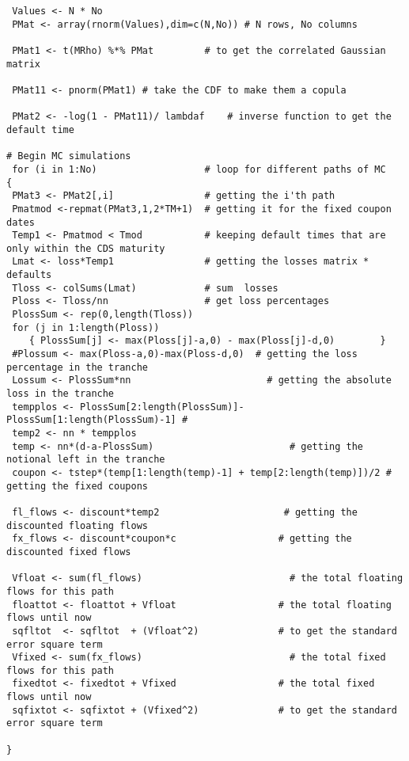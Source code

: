 \begin{singlespace}
\begin{lstlisting}
 Values <- N * No
 PMat <- array(rnorm(Values),dim=c(N,No)) # N rows, No columns
  
 PMat1 <- t(MRho) %*% PMat         # to get the correlated Gaussian matrix  
   
 PMat11 <- pnorm(PMat1) # take the CDF to make them a copula     

 PMat2 <- -log(1 - PMat11)/ lambdaf    # inverse function to get the default time    

# Begin MC simulations 
 for (i in 1:No)                   # loop for different paths of MC 
{       
 PMat3 <- PMat2[,i]                # getting the i'th path        
 Pmatmod <-repmat(PMat3,1,2*TM+1)  # getting it for the fixed coupon dates        
 Temp1 <- Pmatmod < Tmod           # keeping default times that are only within the CDS maturity        
 Lmat <- loss*Temp1                # getting the losses matrix * defaults            
 Tloss <- colSums(Lmat)            # sum  losses         
 Ploss <- Tloss/nn                 # get loss percentages  
 PlossSum <- rep(0,length(Tloss))
 for (j in 1:length(Ploss))
	{ PlossSum[j] <- max(Ploss[j]-a,0) - max(Ploss[j]-d,0)        }
 #Plossum <- max(Ploss-a,0)-max(Ploss-d,0)  # getting the loss percentage in the tranche         
 Lossum <- PlossSum*nn                        # getting the absolute loss in the tranche         
 tempplos <- PlossSum[2:length(PlossSum)]-PlossSum[1:length(PlossSum)-1] #          
 temp2 <- nn * tempplos         
 temp <- nn*(d-a-PlossSum)                        # getting the notional left in the tranche                
 coupon <- tstep*(temp[1:length(temp)-1] + temp[2:length(temp)])/2 # getting the fixed coupons 
        
 fl_flows <- discount*temp2                      # getting the discounted floating flows         
 fx_flows <- discount*coupon*c                  # getting the discounted fixed flows         

 Vfloat <- sum(fl_flows)                          # the total floating flows for this path         
 floattot <- floattot + Vfloat                  # the total floating flows until now         
 sqfltot  <- sqfltot  + (Vfloat^2)              # to get the standard error square term         
 Vfixed <- sum(fx_flows)                          # the total fixed flows for this path         
 fixedtot <- fixedtot + Vfixed                  # the total fixed flows until now         
 sqfixtot <- sqfixtot + (Vfixed^2)              # to get the standard error square term     

}    


\end{lstlisting}
\end{singlespace}
